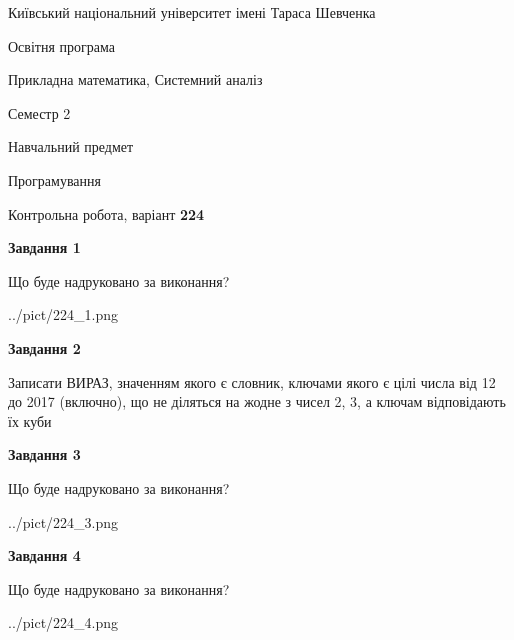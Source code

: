 \documentclass[12pt, ukrainian]{article}
\begin{document}
{{\begin {small}\par
{ \center  Київський національний університет імені Тараса Шевченка \par}
{\parbox {5 cm}{Освітня програма \hfill}{\parbox {8 cm}{Прикладна математика, Системний аналіз \hfill}}\parbox {5 cm}{\hfill Семестр 2}}\par
{\parbox {5 cm} {Навчальний предмет \hfill}\parbox {7 cm}{Програмування \hfill}\parbox {6cm}{\hfill}\par}\vspace{-7pt} \end{small}}{\center Контрольна робота, варіант  \No \textbf
{ 224 }\par}}
{
\begin {large}
{\begin {center}\textbf{Завдання 1}\end {center}}\par
Що буде надруковано за виконання?\par\par
\begin{center}
	{../pict/224_1.png}
\end{center}
\newpage

{\begin {center}\textbf{Завдання 2}\end {center}}\par
Записати ВИРАЗ, значенням якого є словник, ключами якого є цілі числа від 12 до 2017 (включно), що не діляться на жодне з чисел 2, 3, а ключам відповідають їх куби\par
\newpage

{\begin {center}\textbf{Завдання 3}\end {center}}\par
Що буде надруковано за виконання?\par
\begin{center}
	{../pict/224_3.png}
\end{center}
\newpage

{\begin {center}\textbf{Завдання 4}\end {center}}\par
Що буде надруковано за виконання?\par
\begin{center}
	{../pict/224_4.png}
\end{center}
\newpage


\end{large}}
\end{document}
